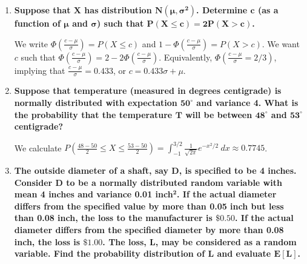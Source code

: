 \documentclass[10pt, oneside]{article}
\begin{document}
\begin{enumerate}[label=9.\arabic*]
\begin{align*}
\frac{d G(y)}{dy} = g(y) &= \frac{d}{dy} \bigg[ \frac{1}{2} + \int^{\frac{\ln y - \mu}{\sigma}}_{0} \frac{1}{\sqrt{2\pi}} \exp \bigg( -\frac{1}{2} z^2 \bigg) \ dz \bigg] \\
&= \boxed{ \frac{1}{\sqrt{2 \pi} \sigma y} \exp \bigg[-\frac{1}{2} \bigg( \frac{\ln y - \mu}{\sigma} \bigg)^2 \bigg], \quad 0 < y < +\infty }
\end{align*}

\item  \begin{tcolorbox}[
  colback=Cerulean!5!white,
  colframe=Cerulean!75!black]
\textbf{Suppose that $\bm{X}$ has distribution $\bm{N(\mu, \sigma^2)}$. Determine $\bm{c}$ (as a function of $\bm{\mu}$ and $\bm{\sigma}$) such that $\bm{P(X \leq c) = 2 P(X > c)}$.}
\end{tcolorbox}

We write $\Phi (\frac{c - \mu}{\sigma}) = P(X \leq c)$ and $1 - \Phi (\frac{c - \mu}{\sigma}) = P(X > c)$. We want $c$ such that $\Phi (\frac{c - \mu}{\sigma}) = 2 - 2 \Phi(\frac{c - \mu}{\sigma})$. Equivalently, $\Phi (\frac{c - \mu}{\sigma} = 2/3)$, implying that $\frac{c - \mu}{\sigma} = 0.433$, or $\boxed{c = 0.433 \sigma + \mu}$.

\item  \begin{tcolorbox}[
  colback=Cerulean!5!white,
  colframe=Cerulean!75!black]
\textbf{Suppose that temperature (measured in degrees centigrade) is normally distributed with expectation $\bm{50^\circ}$ and variance 4. What is the probability that the temperature $\bm{T}$ will be between $\bm{48^\circ}$ and $\bm{53^\circ}$ centigrade?}
\end{tcolorbox}

We calculate $P(\frac{48-50}{2} \leq X \leq \frac{53-50}{2}) = \int^{3/2}_{-1} \frac{1}{\sqrt{2\pi}} e^{-x^2/2} \ dx \approx \boxed{0.7745}$.

\newpage
\item  \begin{tcolorbox}[
  colback=Cerulean!5!white,
  colframe=Cerulean!75!black]
\textbf{The outside diameter of a shaft, say $\bm{D}$, is specified to be 4 inches. Consider $\bm{D}$ to be a normally distributed random variable with mean 4 inches and variance 0.01 inch$\bm{^2}$. If the actual diameter differs from the specified value by more than 0.05 inch but less than 0.08 inch, the loss to the manufacturer is $\bm{\$ 0.50}$. If the actual diameter differs from the specified diameter by more than 0.08 inch, the loss is $\bm{\$ 1.00}$. The loss, $\bm{L}$, may be considered as a random variable. Find the probability distribution of $\bm{L}$ and evaluate $\bm{E[L]}$.}
\end{tcolorbox}


\end{enumerate}
\end{document}
